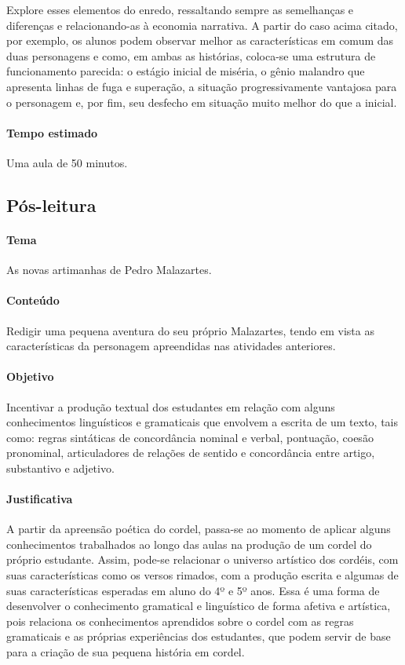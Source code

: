 \documentclass[11pt]{extarticle}
\begin{document}
Explore esses elementos do enredo, ressaltando sempre as semelhanças e diferenças e relacionando-as à economia narrativa. A partir do caso acima citado, por exemplo, os alunos podem observar melhor as características em comum das duas personagens e como, em ambas as histórias, coloca-se uma estrutura de funcionamento parecida: o estágio inicial de miséria, o gênio malandro que apresenta linhas de fuga e superação, a situação progressivamente vantajosa para o personagem e, por fim, seu desfecho em situação muito melhor do que a inicial.

\paragraph{Tempo estimado} Uma aula de 50 minutos.

\subsection{Pós-leitura}

\paragraph{Tema} As novas artimanhas de Pedro Malazartes. 

\paragraph{Conteúdo} Redigir uma pequena aventura do seu próprio Malazartes, tendo em vista as características da personagem apreendidas nas atividades anteriores.


\paragraph{Objetivo} Incentivar a produção textual dos estudantes em relação com alguns conhecimentos linguísticos e gramaticais que envolvem a escrita de um texto, tais como: regras sintáticas de concordância nominal e verbal, pontuação, coesão pronominal, articuladores de relações de sentido e concordância entre artigo, substantivo e adjetivo.

\paragraph{Justificativa} A partir da apreensão poética do cordel, passa-se ao momento de aplicar alguns conhecimentos trabalhados ao longo das aulas na produção de um cordel do próprio estudante. Assim, pode-se relacionar o universo artístico dos cordéis, com suas características como os versos rimados, com a produção escrita e algumas de suas características esperadas em aluno do 4º e 5º anos. Essa é uma forma de desenvolver o conhecimento gramatical e linguístico de forma afetiva e artística, pois relaciona os conhecimentos aprendidos sobre o cordel com as regras gramaticais e as próprias experiências dos estudantes, que podem servir de base para a criação de sua pequena história em cordel.
\end{document}
